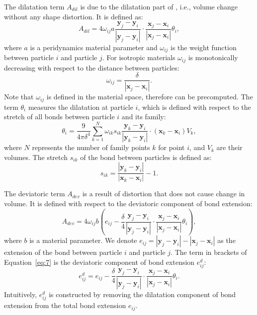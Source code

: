 The dilatation term $A_{dil}$ is due to the dilatation part of , i.e., volume change without any shape distortion. It is defined as:
\begin{equation}
A_{dil}=4\omega_{ij}a\frac{\mathbf{y}_j-\mathbf{y}_i}{|\mathbf{y}_j-\mathbf{y}_i|}\cdot\frac{\mathbf{x}_j-\mathbf{x}_i}{|\mathbf{x}_j-\mathbf{x}_i|}\theta_i,
\label{eq:3}
\end{equation}
where $a$ is a peridynamics material parameter and $\omega_{ij}$ is the weight function between particle $i$ and particle $j$. For isotropic materials $\omega_{ij}$ is monotonically decreasing with respect to the distance between particles:
\begin{equation}
\omega_{ij} = \frac{\delta}{|\mathbf{x}_j-\mathbf{x}_i|}.
\label{eq:4}
\end{equation}
Note that $\omega_{ij}$ is defined in the material space, therefore can be precomputed. The term $\theta_i$ measures the dilatation at particle $i$, which is defined with respect to the stretch of all bonds between particle $i$ and its family:
\begin{equation}
\theta_i = \frac{9}{4\pi\delta^4}\sum_{k=1}^N\omega_{ik}s_{ik}\frac{\mathbf{y}_k-\mathbf{y}_i}{|\mathbf{y}_k-\mathbf{y}_i|}\cdot(\mathbf{x}_k-\mathbf{x}_i)V_k,
\label{eq:5}
\end{equation}
where $N$ represents the number of family points $k$ for point $i$, and $V_k$ are their volumes. The stretch $s_{ik}$ of the bond  between particles is defined as:
\begin{equation}
s_{ik}=\frac{|\mathbf{y}_k-\mathbf{y}_i|}{|\mathbf{x}_k-\mathbf{x}_i|} -1.
\label{eq:6}
\end{equation}

The deviatoric term $A_{dev}$ is a result of distortion that does not cause change in volume. It is defined with respect to the deviatoric component of bond extension:
\begin{equation}
A_{dev}=4\omega_{ij}b(e_{ij}-\frac{\delta}{4}\frac{\mathbf{y}_j-\mathbf{y}_i}{|\mathbf{y}_j-\mathbf{y}_i|}\cdot\frac{\mathbf{x}_j-\mathbf{x}_i}{|\mathbf{x}_j-\mathbf{x}_i|}\theta_i),
\label{eq:7}
\end{equation}
where $b$ is a material parameter. We denote $e_{ij} = |\mathbf{y}_j-\mathbf{y}_i|-|\mathbf{x}_j-\mathbf{x}_i|$ as the extension of the bond between particle $i$ and particle $j$. The term in brackets of Equation~\ref{eq:7} is the deviatoric component of bond extension $e_{ij}^d$:
\begin{equation}
e_{ij}^d = e_{ij}-\frac{\delta}{4}\frac{\mathbf{y}_j-\mathbf{y}_i}{|\mathbf{y}_j-\mathbf{y}_i|}\cdot\frac{\mathbf{x}_j-\mathbf{x}_i}{|\mathbf{x}_j-\mathbf{x}_i|}\theta_i.
\label{eq:8}
\end{equation}
Intuitively, $e_{ij}^d$ is constructed by removing the dilatation component of bond extension from the total bond extension $e_{ij}$.

